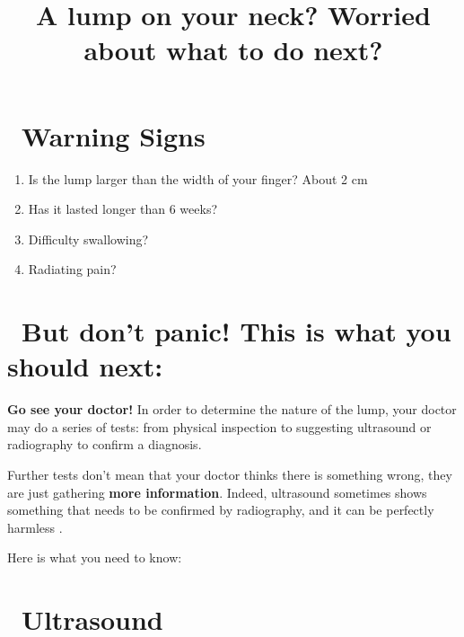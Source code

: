 \documentclass[12pt,nofoldmark,notumble]{leaflet}
\begin{document}
\title{A lump on your neck? Worried about what to do next?}
\date{}

\maketitle

\section{\faWarning\ Warning Signs \cite{JohnsHopkings16}}
\begin{enumerate}
  \item Is the lump larger than the width of your finger? About 2 cm
  \item Has it lasted longer than 6 weeks?
  \item Difficulty swallowing?
  \item Radiating pain?
\end{enumerate} 

\section{\faHeartbeat \ But don't panic! This is what you should next:}
\textbf{Go see your doctor!} In order to determine the nature of the lump, your doctor may do a series of tests: from physical inspection to suggesting ultrasound or radiography to confirm a diagnosis.

Further tests don't mean that your doctor thinks there is something wrong, they are just gathering \textbf{more information}. 
Indeed, ultrasound sometimes shows something that needs to be confirmed by radiography, and it can be perfectly harmless \cite{PepperT2010Ttmu}. 

Here is what you need to know:

\section{\faPlusSquare\ Ultrasound}
\begin{center}
  \setlength{\fboxsep}{0pt}%
  \setlength{\fboxrule}{0pt}%
  \cite{TwoViews}
\end{center}
\end{document}
